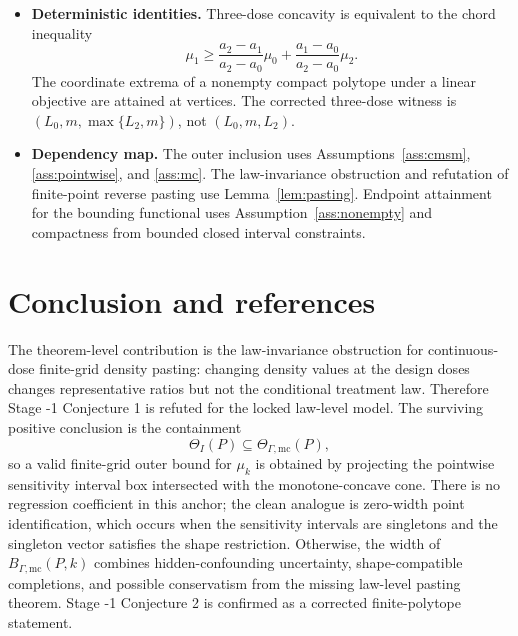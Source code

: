 \documentclass[11pt]{article}
\theoremstyle{definition}
\theoremstyle{plain}
\theoremstyle{remark}
\begin{document}
\begin{itemize}[leftmargin=2em]
\item \textbf{Deterministic identities.}  Three-dose concavity is equivalent to the chord inequality
\[
\mu_1\ge
\frac{a_2-a_1}{a_2-a_0}\mu_0+
\frac{a_1-a_0}{a_2-a_0}\mu_2.
\]
The coordinate extrema of a nonempty compact polytope under a linear objective are attained at vertices.  The corrected three-dose witness is \((L_0,m,\max\{L_2,m\})\), not \((L_0,m,L_2)\).
\item \textbf{Dependency map.}  The outer inclusion uses Assumptions~\ref{ass:cmsm}, \ref{ass:pointwise}, and \ref{ass:mc}.  The law-invariance obstruction and refutation of finite-point reverse pasting use Lemma~\ref{lem:pasting}.  Endpoint attainment for the bounding functional uses Assumption~\ref{ass:nonempty} and compactness from bounded closed interval constraints.
\end{itemize}

\section{Conclusion and references}
The theorem-level contribution is the law-invariance obstruction for continuous-dose finite-grid density pasting: changing density values at the design doses changes representative ratios but not the conditional treatment law.  Therefore Stage -1 Conjecture 1 is refuted for the locked law-level model.  The surviving positive conclusion is the containment
\[
  \Theta_I(P)\subseteq\Theta_{\Gamma,\mathrm{mc}}(P),
\]
so a valid finite-grid outer bound for \(\mu_k\) is obtained by projecting the pointwise sensitivity interval box intersected with the monotone-concave cone.  There is no regression coefficient in this anchor; the clean analogue is zero-width point identification, which occurs when the sensitivity intervals are singletons and the singleton vector satisfies the shape restriction.  Otherwise, the width of \(B_{\Gamma,\mathrm{mc}}(P,k)\) combines hidden-confounding uncertainty, shape-compatible completions, and possible conservatism from the missing law-level pasting theorem.  Stage -1 Conjecture 2 is confirmed as a corrected finite-polytope statement.
\end{document}

